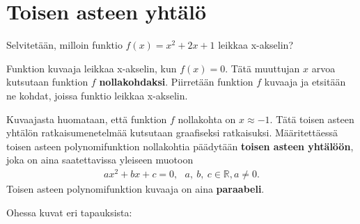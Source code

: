 \chapter{Toisen asteen yhtälö}
\begin{esimerkki}
Selvitetään, milloin funktio $f(x)=x^2+2x+1$ leikkaa x-akselin? 

Funktion kuvaaja leikkaa x-akselin, kun $f(x)=0$. Tätä muuttujan $x$ arvoa kutsutaan funktion $f$ \textbf{nollakohdaksi}. Piirretään funktion $f$ kuvaaja ja etsitään ne kohdat, joissa funktio leikkaa x-akselin. %

\begin{kuvaajapohja}{1.5}{-2.5}{0.5}{-0.5}{3}
\end{kuvaajapohja}

\end{esimerkki}

Kuvaajasta huomataan, että funktion $f$ nollakohta on $x \approx -1$. Tätä toisen asteen yhtälön ratkaisumenetelmää kutsutaan graafiseksi ratkaisuksi.
Määritettäessä toisen asteen polynomifunktion nollakohtia päädytään \textbf{toisen asteen yhtälöön}, joka on aina saatettavissa yleiseen muotoon
\begin{align*}
ax^2+bx+c=0, \ \ \ a, \ b, \ c  \in \mathbb{R}, a \neq 0.
\end{align*}
Toisen asteen polynomifunktion kuvaaja on aina \textbf{paraabeli}. \\


Ohessa kuvat eri tapauksista:

